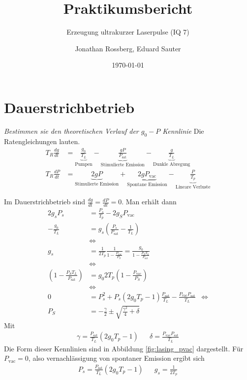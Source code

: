 \documentclass[11pt,twoside=semi]{scrartcl}
\title{Praktikumsbericht}
\subtitle{Erzeugung ultrakurzer Laserpulse (IQ 7)}
\author{Jonathan Rossberg,
      Eduard Sauter}
\date{\today}
\newcommand{\dd}[2]{\frac{d{#1}}{d{#2}}}
\begin{document}
\maketitle
\newpage
\section{Dauerstrichbetrieb}
\textsl{Bestimmen sie den theoretischen Verlauf der $g_0-P$ Kennlinie} 
%
Die Ratengleichungen lauten.
\begin{align*}
  T_R \dd{g}{t} & 
    = \underbrace{\frac{g_0}{T_L}}_{\text{Pumpen}}   
    - \underbrace{\frac{g P}{ P_{\text{sat}}}}_{\text{Stimulierte Emission}}  
    - \underbrace{\frac{g}{T_L}}_{\text{Dunkle Abregung}} \\
  T_R \dd{P}{t} & 
    = \underbrace{2 g P}_{\text{Stimulierte Emission}}  
    + \underbrace{2 g P_\text{vac}}_{\text{Spontane Emission}}  
    - \underbrace{\frac{P}{T_p}}_{\text{Lineare Verluste}}
\end{align*}


Im Dauerstrichbetrieb sind $\dd{g}{t} = \dd{P}{t} = 0$. 
Man erhält dann
%
\begin{align*}
  2 g_s P_s  & = \frac{P_s}{T_p} - 2 g_S P_\text{vac} \\
  - \frac{g_0}{T_L}  & = g_s\left( \frac{P_s}{P_\text{sat}} - \frac{1}{T_L} \right) \\
  & \iff  \\
  g_s & = \frac{1}{2 T_p} \frac{1}{1- \frac{P_\text{vac}}{P_S}} = \frac{g_0}{1 - \frac{P_S T_L}{P_\text{sat}}} \\
  & \iff   \\
  \left( 1 - \frac{P_S T_L}{P_\text{sat}} \right)  & = g_0 2 T_p \left( 1 - \frac{P_\text{vac}}{P_S} \right) \\
  & \iff  \\
  0 & = P_s^2 + P_s (2 g_0 T_p - 1) \frac{P_\text{sat}}{T_L} - \frac{P_\text{vac}P_\text{sat}}{T_L}
  & \iff \\
  P_S & = - \frac{\gamma}{2} \pm \sqrt{\frac{\gamma^2}{4} + \delta}
\end{align*}
Mit 
%
\begin{align*}
  \gamma = \frac{P_\text{sat}}{T_L} (2 g_0 T_p - 1) && \delta = \frac{P_\text{vac} P_\text{sat}}{T_L}
\end{align*}
%
Die Form dieser Kennlinien sind in Abbildung \ref{fig:lasing_pvac} dargestellt.
%
Für $P_\text{vac} = 0 $, also vernachlässigung von spontaner Emission ergibt sich
%
\begin{align*}
  P_s = \frac{P_\text{sat}}{T_L} (2 g_0 T_p - 1) && g_s = \frac{1}{2 T_p}
\end{align*}
%
\end{document}
